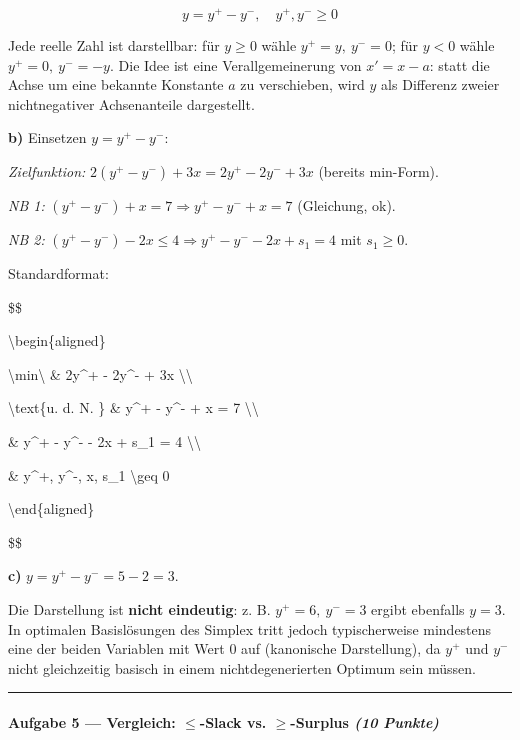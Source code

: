 \documentclass[11pt, a4paper]{article}
\begin{document}
\[
y = y^+ - y^-,\quad y^+, y^- \geq 0
\]


Jede reelle Zahl ist darstellbar: für $y \geq 0$ wähle $y^+ = y,\ y^- = 0$; für $y < 0$ wähle $y^+ = 0,\ y^- = -y$. Die Idee ist eine Verallgemeinerung von $x' = x - a$: statt die Achse um eine bekannte Konstante $a$ zu verschieben, wird $y$ als Differenz zweier nichtnegativer Achsenanteile dargestellt.


\textbf{b)} Einsetzen $y = y^+ - y^-$:


\textit{Zielfunktion:} $2(y^+ - y^-) + 3x = 2y^+ - 2y^- + 3x$ (bereits min-Form).


\textit{NB 1:} $(y^+ - y^-) + x = 7 \Rightarrow y^+ - y^- + x = 7$ (Gleichung, ok).


\textit{NB 2:} $(y^+ - y^-) - 2x \leq 4 \Rightarrow y^+ - y^- - 2x + s_1 = 4$ mit $s_1 \geq 0$.


Standardformat:


\$\$

\textbackslash{}begin\{aligned\}

\textbackslash{}min\textbackslash{} \& 2y\textasciicircum{}+ - 2y\textasciicircum{}- + 3x \textbackslash{}\textbackslash{}

\textbackslash{}text\{u. d. N. \} \& y\textasciicircum{}+ - y\textasciicircum{}- + x = 7 \textbackslash{}\textbackslash{}

\& y\textasciicircum{}+ - y\textasciicircum{}- - 2x + s\_1 = 4 \textbackslash{}\textbackslash{}

\& y\textasciicircum{}+, y\textasciicircum{}-, x, s\_1 \textbackslash{}geq 0

\textbackslash{}end\{aligned\}

\$\$


\textbf{c)} $y = y^+ - y^- = 5 - 2 = 3$.


Die Darstellung ist \textbf{nicht eindeutig}: z. B. $y^+ = 6,\ y^- = 3$ ergibt ebenfalls $y = 3$. In optimalen Basislösungen des Simplex tritt jedoch typischerweise mindestens eine der beiden Variablen mit Wert 0 auf (kanonische Darstellung), da $y^+$ und $y^-$ nicht gleichzeitig basisch in einem nichtdegenerierten Optimum sein müssen.



\noindent\textcolor{rulegray}{\rule{\linewidth}{0.4pt}}


\paragraph{Aufgabe 5 — Vergleich: $\leq$-Slack vs. $\geq$-Surplus \textit{(10 Punkte)}}\mbox{}\\[2pt]
\end{document}
